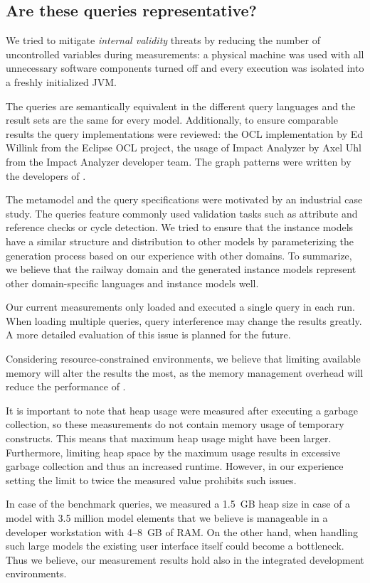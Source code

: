 \subsection{Are these queries representative?}


We tried to mitigate \emph{internal validity} threats by reducing the number of
uncontrolled variables during measurements: a physical machine was used with all
unnecessary software components turned off and every execution was isolated into
a freshly initialized JVM.

The queries are semantically equivalent in the different query languages and the
result sets are the same for every model. Additionally, to ensure comparable
results the query implementations were reviewed: the OCL
implementation by Ed Willink from the Eclipse OCL project, the usage of Impact
Analyzer by Axel Uhl from the Impact Analyzer developer team. The graph patterns
were written by the developers of \incquery{}.

The metamodel and the query specifications were motivated by an industrial case
study. The queries feature commonly used validation tasks such as
attribute and reference checks or cycle detection. We tried to ensure that the
instance models have a similar structure and distribution to other models by
parameterizing the generation process based on our experience with other
domains. To summarize, we believe that the railway domain and the generated
instance models represent other domain-specific languages and instance
models well.

Our current measurements only loaded and executed a single query in each run.
When loading multiple queries, query interference may change the results
greatly. A more detailed evaluation of this issue is planned for the future.

Considering resource-constrained environments, we believe that limiting
available memory will alter the results the most, as the memory management
overhead will reduce the performance of \incquery{}.

It is important to note that heap usage were measured after executing a garbage
collection, so these measurements do not contain memory usage of temporary
constructs. This means that maximum heap usage might have been larger. Furthermore,
limiting heap space by the maximum usage results in excessive garbage collection
and thus an increased runtime. However, in our experience setting the limit to
twice the measured value prohibits such issues.

In case of the benchmark queries, we measured a 1.5~GB heap size in case of a
model with 3.5 million model elements that we believe is manageable in a developer
workstation with 4--8~GB of RAM. On the other hand, when handling such large
models the existing user interface itself could become a bottleneck. Thus we
believe, our measurement results hold also in the integrated development
environments.
